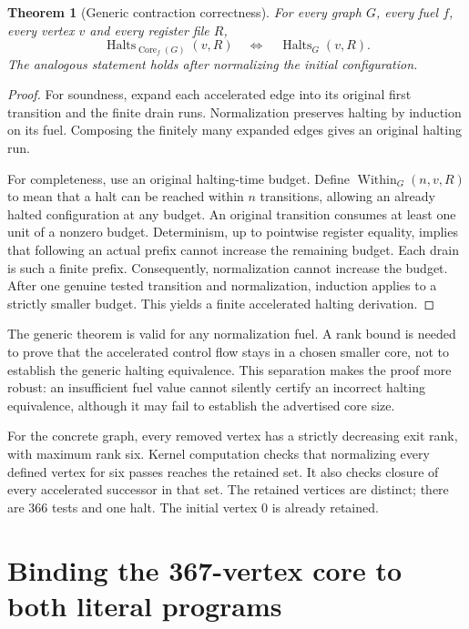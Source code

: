 \documentclass[11pt,letterpaper]{article}
\newtheorem{theorem}{Theorem}[section]
\theoremstyle{definition}\newtheorem{definition}[theorem]{Definition}
\newcommand{\Halts}{\operatorname{Halts}}
\newcommand{\Core}{\operatorname{Core}}
\begin{document}
\begin{theorem}[Generic contraction correctness]\label{thm:core}
For every graph $G$, every fuel $f$, every vertex $v$ and every register file
$R$,
\[
 \Halts_{\Core_f(G)}(v,R)\quad\Longleftrightarrow\quad\Halts_G(v,R).
\]
The analogous statement holds after normalizing the initial configuration.
\end{theorem}

\begin{proof}
For soundness, expand each accelerated edge into its original first transition
and the finite drain runs. Normalization preserves halting by induction on its
fuel. Composing the finitely many expanded edges gives an original halting run.

For completeness, use an original halting-time budget. Define
$\operatorname{Within}_G(n,v,R)$ to mean that a halt can be reached within $n$
transitions, allowing an already halted configuration at any budget. An original
transition consumes at least one unit of a nonzero budget. Determinism, up to
pointwise register equality, implies that following an actual prefix cannot
increase the remaining budget. Each drain is such a finite prefix. Consequently,
normalization cannot increase the budget. After one genuine tested transition
and normalization, induction applies to a strictly smaller budget. This yields
a finite accelerated halting derivation.
\end{proof}

The generic theorem is valid for any normalization fuel. A rank bound is needed
to prove that the accelerated control flow stays in a chosen smaller core, not
to establish the generic halting equivalence. This separation makes the proof
more robust: an insufficient fuel value cannot silently certify an incorrect
halting equivalence, although it may fail to establish the advertised core size.

For the concrete graph, every removed vertex has a strictly decreasing exit
rank, with maximum rank six. Kernel computation checks that normalizing every
defined vertex for six passes reaches the retained set. It also checks closure
of every accelerated successor in that set. The retained vertices are distinct;
there are 366 tests and one halt. The initial vertex 0 is already retained.

\section{Binding the 367-vertex core to both literal programs}
\end{document}
